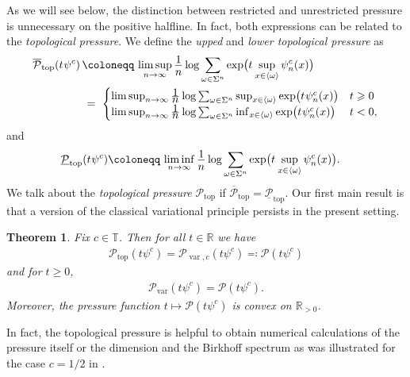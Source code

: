 \documentclass[11pt,reqno]{amsart}
\theoremstyle{plain}
\newtheorem{theorem}{Theorem}[section]
\theoremstyle{definition}
\newcommand{\R}{{\mathbb R}}
\newcommand{\T}{{\mathbb T}}
\newcommand{\cP}{\mathcal{P}}
\newcommand{\ts}{\hspace{0.5pt}}
\newcommand{\myfrac}[2]{\frac{\raisebox{-2pt}{$#1$}}
      {\raisebox{0.5pt}{$#2$}}}
\begin{document}
As we will see below, the distinction between restricted and unrestricted pressure is unnecessary on the positive halfline. In fact, both expressions can be related to the \emph{topological pressure}. We define the \emph{upped} and \emph{lower topological pressure} as
\begin{align}
  \overline{\cP}_{\operatorname{top}} (t\ts \psi^{c}) \, 
  &\coloneqq \,\limsup_{n\to\infty}\myfrac{1}{n}\log\sum_{\omega\in\Sigma^n}
  \exp \bigl(t\ts \sup_{x\in \langle\omega\rangle}\psi^{c}_{n}(x)\bigr)\notag\\
  &\,= \,\,\begin{cases}\limsup_{n\to\infty} \myfrac{1}{n}\log\sum_{\omega\in\Sigma^n}
  \sup_{x\in \langle\omega\rangle}\exp \bigl(t\ts \psi^{c}_{n}(x)\bigr)& t\geqslant 0\\
  \limsup_{n\to\infty} \myfrac{1}{n}\log\sum_{\omega\in\Sigma^n}
  \inf_{x\in \langle\omega\rangle}\exp \bigl(t\ts \psi^{c}_{n}(x)\bigr)&t<0,  \end{cases}\label{eq: def top pressure}\end{align}
  and
  \begin{align*}
    \underline{\cP}_{\operatorname{top}} (t\ts \psi^{c})
  &\coloneqq \,\liminf_{n\to\infty}\myfrac{1}{n}\log\sum_{\omega\in\Sigma^n}
  \exp \bigl(t\ts \sup_{x\in \langle\omega\rangle}\psi^{c}_{n}(x)\bigr).
\end{align*}
We talk about the \emph{topological pressure} $\cP_{\operatorname{top}}$ if $\overline{\cP}_{\operatorname{top}}=\underline{\cP}_{\operatorname{top}}$.
 Our first main result is that a version of the classical variational principle persists in the present setting.

\begin{theorem}\label{thm: Ptop=Pvar}
Fix  $c\in \T$. Then for all $t\in\mathbb{R}$   we have 
 \begin{align}
  \mathcal{P}_{\operatorname{top}}\left(t\psi^c\right)=\mathcal{P}_{ \operatorname{var},c}\left(t\psi^c\right)\eqqcolon \mathcal{P}\left(t\psi^c\right)\label{eq: pressure 1}
 \end{align}
 and for $t\geqslant 0$,
\begin{align}
\mathcal{P}_{\operatorname{var}}\left(t\psi^c\right)= \mathcal{P}\left(t\psi^c\right).
\label{eq: pressure 2}
\end{align}
Moreover, the pressure function $t\mapsto \mathcal{P}\left(t\psi^c\right)$ is convex on $\R _{>0}$.
\end{theorem}

In fact, the topological pressure is helpful to obtain numerical calculations of the pressure itself or the dimension and the Birkhoff spectrum as was illustrated for the case $c =1/2$ in \cite{BGKS}.
\end{document}
